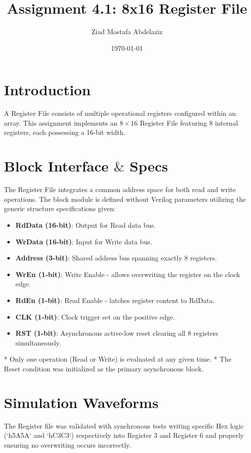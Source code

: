\documentclass[11pt]{article}
\title{Assignment 4.1: 8x16 Register File}
\author{Ziad Mostafa Abdelaziz}
\date{\today}
\begin{document}
\maketitle

\section{Introduction}
A Register File consists of multiple operational registers configured within an array. This assignment implements an $8 \times 16$ Register File featuring 8 internal registers, each possessing a 16-bit width. 

\section{Block Interface $\&$ Specs}
The Register File integrates a common address space for both read and write operations. The block module is defined without Verilog parameters utilizing the generic structure specifications given:
\begin{itemize}
    \item \textbf{RdData (16-bit)}: Output for Read data bus.
    \item \textbf{WrData (16-bit)}: Input for Write data bus.
    \item \textbf{Address (3-bit)}: Shared address bus spanning exactly 8 registers.
    \item \textbf{WrEn (1-bit)}: Write Enable - allows overwriting the register on the clock edge.
    \item \textbf{RdEn (1-bit)}: Read Enable - latches register content to RdData.
    \item \textbf{CLK (1-bit)}: Clock trigger set on the positive edge.
    \item \textbf{RST (1-bit)}: Asynchronous active-low reset clearing all 8 registers simultaneously. 
\end{itemize}
* Only one operation (Read or Write) is evaluated at any given time.
* The Reset condition was initialized as the primary asynchronous block.

\section{Simulation Waveforms}
The Register file was validated with synchronous tests writing specific Hex logic (`h5A5A` and `hC3C3`) respectively into Register 3 and Register 6 and properly ensuring no overwriting occurs incorrectly.
\end{document}
